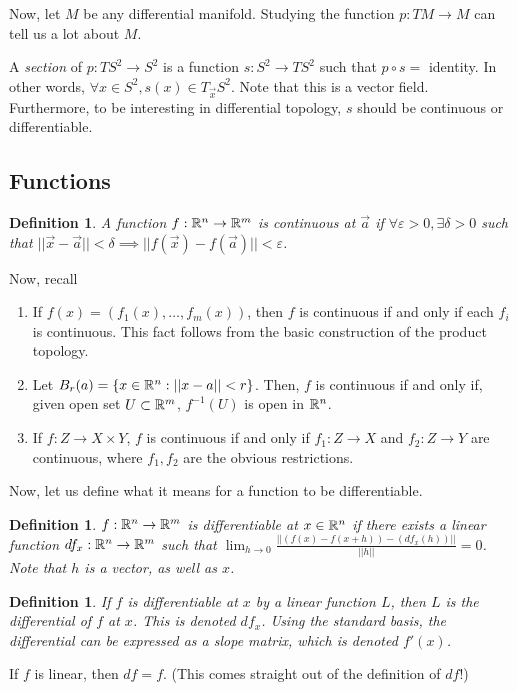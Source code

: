 \documentclass[11pt,leqno,oneside]{amsart}
\renewcommand{\epsilon}{\varepsilon}
\newcommand{\de}{\emph}
\theoremstyle{mystyle} \newtheorem{thrm}[thm]{Theorem}
\theoremstyle{mystyle} \newtheorem{defi}[thm]{Definition}
\begin{document}
Now, let $M$ be any differential manifold. Studying the function $p: TM \to M$
can tell us a lot about $M$.

\begin{example}
	A \de{section} of $p: TS^2 \to S^2$ is a function $s: S^2 \to TS^2$ such
	that $p \circ s =$ identity. In other words, $\forall x \in S^2, s(x) \in
	T_{\vec{x}}S^2$. Note that this is a vector field. Furthermore, to be
	interesting in differential topology, $s$ should be continuous or
	differentiable.
\end{example}



\subsection{Functions}

\begin{defi}
	A function $f: {\mathbb R}^n \to {\mathbb R}^m$ is continuous at $\vec{a}$ if $\forall
	\epsilon > 0, \exists \delta > 0$ such that $||\vec{x}-\vec{a}|| < \delta
	\implies ||f(\vec{x}) - f(\vec{a})|| < \epsilon$.
\end{defi}
Now, recall \begin{enumerate}
	\item If $f(x) = (f_1(x), \ldots, f_m(x))$, then $f$ is continuous if and
		only if each $f_i$ is continuous. This fact follows from the basic
		construction of the product topology.
	\item Let $B_r(a) = \{x \in {\mathbb R}^n : ||x-a|| < r\}$. Then, $f$ is continuous
		if and only if, given open set $U \subset {\mathbb R}^m$, $f^{-1}(U)$ is open in
		${\mathbb R}^n$.
	\item If $f: Z \to X \times Y$, $f$ is continuous if and only if $f_1: Z
		\to X$ and $f_2: Z \to Y$ are continuous, where $f_1, f_2$ are the
		obvious restrictions.
\end{enumerate}

Now, let us define what it means for a function to be differentiable.
\begin{defi}
	$f :{\mathbb R}^n \to {\mathbb R}^m$ is \de{differentiable} at $x \in {\mathbb R}^n$ if there exists a linear function $df_x : {\mathbb R}^n \to {\mathbb R}^m$  such that $\lim_{h \to 0} \frac{|| (f(x)-f(x+h)) - (df_x(h)) ||}{||h||} = 0$.  Note that $h$ is a vector, as well as $x$.
\end{defi}
\begin{defi}
	If $f$ is differentiable at $x$ by a linear function $L$, then $L$ is the \de{differential} of $f$ at $x$.  This is denoted $df_x$.  Using the standard basis, the differential can be expressed as a slope matrix, which is denoted $f'(x)$.
\end{defi}
\begin{cor}
	If $f$ is linear, then $df = f$.  (This comes straight out of the definition of $df$!)
\end{cor}
\end{document}
